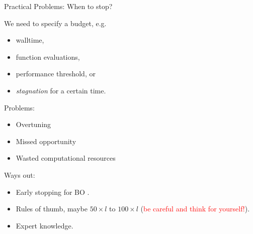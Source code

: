 	\begin{frame}{Practical Problems: When to stop?}

		We need to specify a budget, e.g.
		\begin{itemize}
			\item walltime,
			\item function evaluations,
			\item performance threshold, or
			\item \textit{stagnation} for a certain time.
		\end{itemize}

		Problems:
		\begin{itemize}
			\item Overtuning  
			\item Missed opportunity 
			\item Wasted computational resources
		\end{itemize}


		Ways out:
		\begin{itemize}
			\item Early stopping for BO .
			\item Rules of thumb, maybe $50 \times l$ to $100 \times l$  (\textcolor{red}{be careful and think for yourself!}).
			\item Expert knowledge.
		\end{itemize}

	\end{frame}

